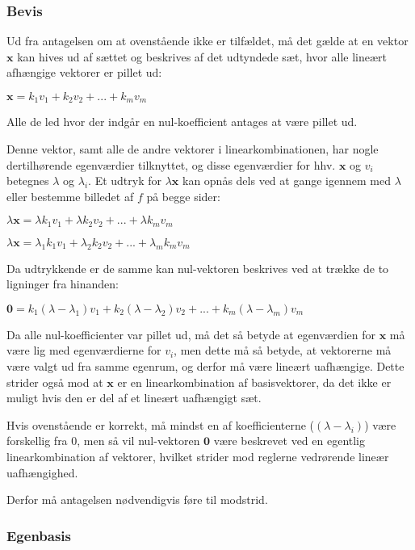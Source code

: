 \documentclass{article}
\newcommand{\cent}[1]{\begin{center}#1\end{center}}
\begin{document}
	\subsubsection*{Bevis}
	
	Ud fra antagelsen om at ovenstående ikke er tilfældet, må det gælde at en vektor $ \textbf{x} $ kan hives ud af sættet og beskrives af det udtyndede sæt, hvor alle lineært afhængige vektorer er pillet ud: 
	
	\cent{$ \textbf{x} = k_1v_1+k_2v_2+...+k_mv_m $}
	
	Alle de led hvor der indgår en nul-koefficient antages at være pillet ud. \newline
	
	Denne vektor, samt alle de andre vektorer i linearkombinationen, har nogle dertilhørende egenværdier tilknyttet, og disse  egenværdier for hhv. $\textbf{x}$ og $v_i$ betegnes $\lambda$ og $\lambda_i$. Et udtryk for $\lambda\textbf{x}$ kan opnås dels ved at gange igennem med $\lambda$ eller bestemme billedet af $f$ på begge sider:
	
	\cent{$\lambda\textbf{x} = \lambda k_1 v_1+\lambda k_2 v_2+...+\lambda k_m v_m $}
	\cent{$\lambda\textbf{x} = \lambda_1 k_1 v_1+\lambda_2 k_2 v_2+...+\lambda_m k_m v_m $}
	
	Da udtrykkende er de samme kan nul-vektoren beskrives ved at trække de to ligninger fra hinanden:
	
	\cent{ $ \textbf{0} = k_1(\lambda - \lambda_1)v_1 + k_2(\lambda - \lambda_2)v_2 + ... + k_m(\lambda - \lambda_m)v_m $ }
	
	Da alle nul-koefficienter var pillet ud, må det så betyde at egenværdien for $ \textbf{x} $ må være lig med egenværdierne for $v_i$, men dette må så betyde, at vektorerne må være valgt ud fra samme egenrum, og derfor må være lineært uafhængige. Dette strider også mod at $\textbf{x}$ er en linearkombination af basisvektorer, da det ikke er muligt hvis den er del af et lineært uafhængigt sæt. \newline
	
	Hvis ovenstående er korrekt, må mindst en af koefficienterne ($(\lambda-\lambda_i)$) være forskellig fra 0, men så vil nul-vektoren $\textbf{0}$ være beskrevet ved en egentlig linearkombination af vektorer, hvilket strider mod reglerne vedrørende lineær uafhængighed.\newline
	
	Derfor må antagelsen nødvendigvis føre til modstrid.
	
	\subsubsection{Egenbasis}
	
\end{document}
